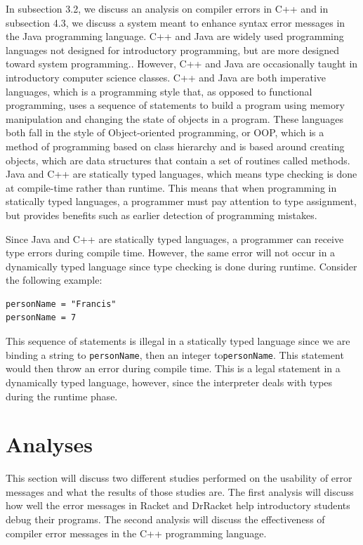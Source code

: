 \documentclass{sig-alternate}
\begin{document}
In subsection 3.2, we discuss an analysis on compiler errors in C++ and in subsection 4.3, we discuss a system meant to enhance syntax error messages in the Java programming language.
C++ and Java are widely used programming languages not designed for introductory programming, but are more designed toward system programming..
However, C++ and Java are occasionally taught in introductory computer science classes.
C++ and Java are both imperative languages, which is a programming style that, as opposed to functional programming, uses a sequence of statements to build a program using memory manipulation and changing the state of objects in a program.
These languages both fall in the style of Object-oriented programming, or OOP, which is a method of programming based on class hierarchy and is based around creating objects, which are data structures that contain a set of routines called methods. 
Java and C++ are statically typed languages, which means type checking is done at compile-time rather than runtime. 
This means that when programming in statically typed languages, a programmer must pay attention to type assignment, but provides benefits such as earlier detection of programming mistakes.

Since Java and C++ are statically typed languages, a programmer can receive type errors during compile time.
However, the same error will not occur in a dynamically typed language since type checking is done during runtime.
Consider the following example:

\begin{verbatim}
personName = "Francis"
personName = 7
\end{verbatim}

This sequence of statements is illegal in a statically typed language since we are binding a string to \texttt{personName}, then an integer to\texttt{personName}.
This statement would then throw an error during compile time.
This is a legal statement in a dynamically typed language, however, since the interpreter deals with types during the runtime phase. 


\section{Analyses}\label{sec:analyses}
This section will discuss two different studies performed on the usability of error messages and what the results of those studies are.
The first analysis will discuss how well the error messages in Racket and DrRacket help introductory students debug their programs.
The second analysis will discuss the effectiveness of compiler error messages in the C++ programming language. 
\end{document}
